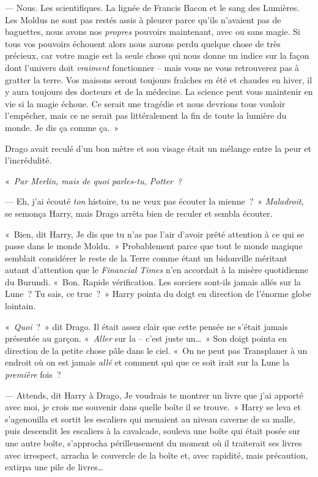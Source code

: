 --- Nous. Les scientifiques. La lignée de Francis Bacon et le sang des Lumières. Les Moldus ne sont pas restés assis à pleurer parce qu'ils n'avaient pas de baguettes, nous avons nos \emph{propres} pouvoirs maintenant, avec ou sans magie. Si tous vos pouvoirs échouent alors nous aurons perdu quelque chose de très précieux, car votre magie est la seule chose qui nous donne un indice sur la façon dont l'univers doit \emph{vraiment} fonctionner -- mais vous ne vous retrouverez pas à gratter la terre. Vos maisons seront toujours fraîches en été et chaudes en hiver, il y aura toujours des docteurs et de la médecine. La science peut vous maintenir en vie si la magie échoue. Ce serait une tragédie et nous devrions tous vouloir l'empêcher, mais ce ne serait pas littéralement la fin de toute la lumière du monde. Je dis ça comme ça.~»

Drago avait reculé d'un bon mètre et son visage était un mélange entre la peur et l'incrédulité.

«~\emph{Par Merlin, mais de quoi parles-tu, Potter~?}

--- Eh, j'ai écouté \emph{ton} histoire, tu ne veux pas écouter la mienne~?~» \emph{Maladroit}, se semonça Harry, mais Drago arrêta bien de reculer et sembla écouter.

«~Bien, dit Harry, Je dis que tu n'as pas l'air d'avoir prêté attention à ce qui se passe dans le monde Moldu.~» Probablement parce que tout le monde magique semblait considérer le reste de la Terre comme étant un bidonville méritant autant d'attention que le \emph{Financial Times} n'en accordait à la misère quotidienne du Burundi. «~Bon. Rapide vérification. Les sorciers sont-ils jamais allés sur la Lune~? Tu sais, ce truc~?~» Harry pointa du doigt en direction de l'énorme globe lointain.

«~\emph{Quoi}~?~» dit Drago. Il était assez clair que cette pensée ne s'était jamais présentée au garçon. «~\emph{Aller} sur la -- c'est juste un…~» Son doigt pointa en direction de la petite chose pâle dans le ciel. «~On ne peut pas Transplaner à un endroit où on est jamais \emph{allé} et comment qui que ce soit irait sur la Lune la \emph{première} fois~?

--- Attends, dit Harry à Drago, Je voudrais te montrer un livre que j'ai apporté avec moi, je crois me souvenir dans quelle boîte il se trouve.~» Harry se leva et s'agenouilla et sortit les escaliers qui menaient au niveau caverne de sa malle, puis descendit les escaliers à la cavalcade, souleva une boîte qui était posée sur une autre boîte, s'approcha périlleusement du moment où il traiterait ses livres avec irrespect, arracha le couvercle de la boîte et, avec rapidité, mais précaution, extirpa une pile de livres…

